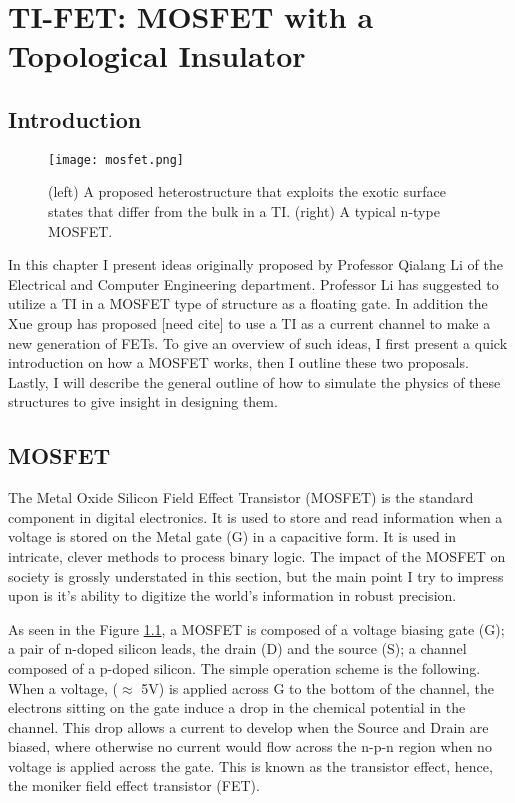 \documentclass[11pt,revtex,aps]{report}
\begin{document}
\chapter{TI-FET: MOSFET with a Topological Insulator}
\section{Introduction}
\begin{figure}[h]
\center
\texttt{[image: mosfet.png]}
\caption{(left) A proposed heterostructure that exploits the exotic surface states that differ from the bulk in a TI. (right) A typical n-type MOSFET.
}\label{mosfet}
\end{figure}
In this chapter I present ideas originally proposed by Professor Qialang Li of the Electrical and Computer Engineering department. Professor Li has suggested to utilize a TI in a MOSFET type of structure as a floating gate. In addition the Xue group has proposed [need cite] to use a TI as a current channel to make a new generation of FETs.  To give an overview of such ideas, I first present a quick introduction on how a MOSFET works, then I outline these two proposals. Lastly, I will describe the general outline of how to simulate the physics of these structures to give insight in designing them.

\section{MOSFET}
The Metal Oxide Silicon Field Effect Transistor (MOSFET) is the standard component in digital electronics. It is used to store and read information when a voltage is stored on the Metal gate (G) in a capacitive form. It is used in intricate, clever methods to process binary logic. The impact of the MOSFET on society is grossly understated in this section, but the main point I try to impress upon is it's ability to digitize the world's information in robust precision.

As seen in the Figure \ref{mosfet}, a MOSFET is composed of a voltage biasing gate (G); a pair of n-doped silicon leads, the drain (D) and the source (S); a channel composed of a p-doped silicon. The simple operation scheme is the following. When a voltage, ($\approx$ 5V) is applied across G to the bottom of the channel, the electrons sitting on the gate induce a drop in the chemical potential in the channel. This drop allows a current to develop when the Source and Drain are biased, where otherwise no current would flow across the n-p-n region when no voltage is applied across the gate. This is known as the transistor effect, hence, the moniker field effect transistor (FET).
\end{document}
